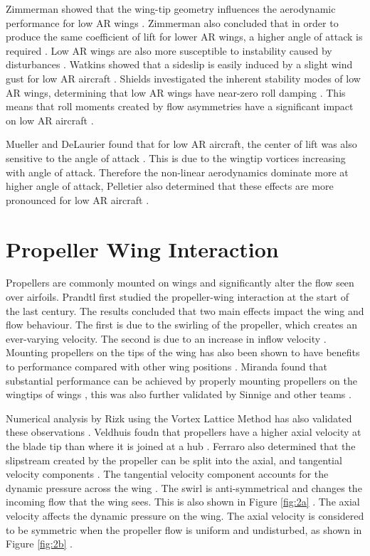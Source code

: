  Zimmerman showed that the wing-tip geometry influences the aerodynamic performance for low AR wings \cite{Zimmerman1936}. Zimmerman also concluded that in order to produce the same coefficient of lift for lower AR wings, a higher angle of attack is required \cite{Zimmerman1936}. Low AR wings are also more susceptible to instability caused by disturbances \cite{DeVoria2017}. Watkins showed that a sideslip is easily induced by a slight wind gust for low AR aircraft \cite{Watkins2012}. Shields investigated the inherent stability modes of low AR wings, determining that low AR wings have near-zero roll damping \cite{Shields2015}. This means that roll moments created by flow asymmetries have a significant impact on low AR aircraft \cite{Shields2015}.
 
 Mueller and DeLaurier found that for low AR aircraft, the center of lift was also sensitive to the angle of attack \cite{Mueller2003}. This is due to the wingtip vortices increasing with angle of attack. Therefore the non-linear aerodynamics dominate more at higher angle of attack, Pelletier also determined that these effects are more pronounced for low AR aircraft \cite{Pelletier2012}. 


\section{Propeller Wing Interaction}




Propellers are commonly mounted on wings and significantly alter the flow seen over airfoils. Prandtl first studied the propeller-wing interaction at the start of the last century. The results concluded that two main effects impact the wing and flow behaviour. The first is due to the swirling of the propeller, which creates an ever-varying velocity. The second is due to an increase in inflow velocity \cite{Pant}. Mounting propellers on the tips of the wing has also been shown to have benefits to performance compared with other wing positions \cite{Miranda1986} . Miranda found that substantial performance can be achieved by properly mounting propellers on the wingtips of wings \cite{Miranda1986}, this was also further validated by Sinnige \cite{Sinnige2019} and other teams \cite{Veldhuis2000} \cite{review}. 

Numerical analysis by Rizk using the Vortex Lattice Method has also validated these observations \cite{Rizk2012}. Veldhuis foudn that propellers have a higher axial velocity at the blade tip than where it is joined at a hub \cite{Veldhuis2000}. Ferraro also determined that the slipstream created by the propeller can be split into the axial, and tangential velocity components \cite{Ferraro2014}. The tangential velocity component accounts for the dynamic pressure across the wing \cite{Ferraro2014}. The swirl is anti-symmetrical and changes the incoming flow that the wing sees. This is also shown in Figure \ref{fig:2a} \cite{Ferraro2014}. The axial velocity affects the dynamic pressure on the wing. The axial velocity is considered to be symmetric when the propeller flow is uniform and undisturbed, as shown in Figure \ref{fig:2b} \cite{Ferraro2014}.


